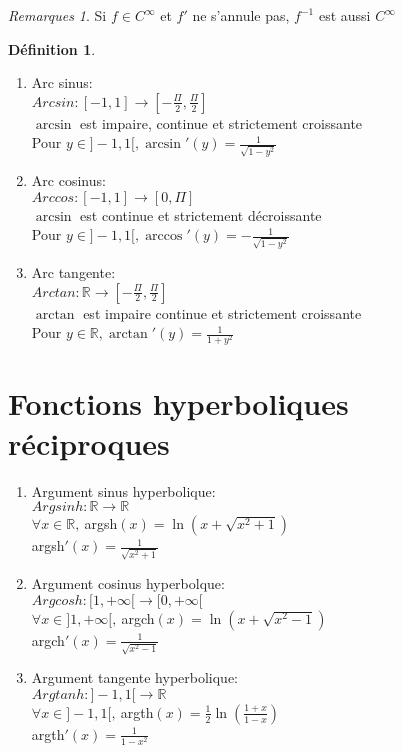 \documentclass[fleqn]{article}
\theoremstyle{definition} \newtheorem*{defi}{D\'efinition}
\theoremstyle{definition} \newtheorem*{theo}{Th\'eor\`eme}
\theoremstyle{definition} \newtheorem*{prop}{Propri\'et\'e}
\theoremstyle{remark} \newtheorem*{rqs}{Remarques}
\begin{document}
\begin{rqs}
	Si $f \in C^{\infty}$ et $f'$ ne s'annule pas, $f^{-1}$ est aussi $C^{\infty}$
\end{rqs}

\begin{defi} $ $
	\begin{enumerate}
	\item Arc sinus: \\
	\(Arcsin: [-1,1] \rightarrow [-\frac{\Pi}{2}, \frac{\Pi}{2}]\) \\
	\(\arcsin\) est impaire, continue et strictement croissante \\
	Pour \(y \in ]-1,1[, \arcsin'(y) = \frac{1}{\sqrt{1-y^2}}\)

	\item Arc cosinus: \\
	\(Arccos: [-1,1] \rightarrow [0, \Pi]\) \\
	\(\arcsin\) est continue et strictement d\'{e}croissante \\
	Pour \(y \in ]-1,1[, \arccos'(y) = -\frac{1}{\sqrt{1-y^2}}\)

	\item Arc tangente: \\
	\(Arctan: \mathbb{R} \rightarrow [-\frac{\Pi}{2},\frac{\Pi}{2}]\) \\
	\(\arctan\) est impaire continue et strictement croissante \\
	Pour \(y \in \mathbb{R}, \arctan'(y) = \frac{1}{1+y^2}\)
	\end{enumerate}
\end{defi}

\section{Fonctions hyperboliques r\'eciproques}
\begin{enumerate}
\item Argument sinus hyperbolique: \\
\(Argsinh: \mathbb{R} \rightarrow \mathbb{R} \) \\
$\forall x \in \mathbb{R},\ $argsh$(x) = \ln(x + \sqrt{x^2 +1})$ \\
argsh$'(x) = \frac{1}{\sqrt{x^2+1}}$

\item Argument cosinus hyperbolque: \\
\(Argcosh: [1, +\infty[ \rightarrow [0,+\infty[ \) \\
$\forall x \in ]1,+\infty[,\  $argch$(x) = \ln(x + \sqrt{x^2-1})$ \\
argch$'(x) = \frac{1}{\sqrt{x^2-1}}$

\item Argument tangente hyperbolique: \\
\(Argtanh: ]-1,1[ \rightarrow \mathbb{R} \) \\
$\forall x \in ]-1,1[,\ $argth$(x) = \frac{1}{2} \ln(\frac{1+x}{1-x})$ \\
argth$'(x) = \frac{1}{1-x^2}$
\end{enumerate}
\end{document}

